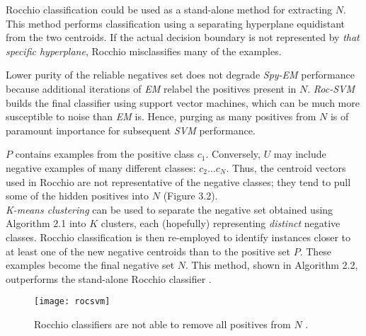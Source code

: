 \documentclass[12pt,twoside,notitlepage,amsart]{report} %
\begin{document}
	
	Rocchio classification could be used as a stand-alone method for extracting $N$. This method performs classification using a separating hyperplane equidistant from the two centroids. If the actual decision boundary is not represented by \emph{that specific hyperplane}, Rocchio misclassifies many of the examples. 
	
	Lower purity of the reliable negatives set does not degrade \emph{Spy-EM} performance because additional iterations of \emph{EM} relabel the positives present in $N$. \emph{Roc-SVM} builds the final classifier using support vector machines, which can be much more susceptible to noise than \emph{EM} is. Hence, purging as many positives from $N$ is of paramount importance for subsequent \emph{SVM} performance. 

	$P$ contains examples from the positive class $c_1$. Conversely, $U$ may include negative examples of many different classes: $c_2 \ldots c_N$. Thus, the centroid vectors used in Rocchio are not representative of the negative classes; they tend to pull some of the hidden positives into $N$ (Figure 3.2). \\

 \emph{K-means clustering} can be used to separate the negative set obtained using Algorithm 2.1 into $K$ clusters, each (hopefully) representing \emph{distinct} negative classes. Rocchio classification is then re-employed to identify instances closer to at least one of the new negative centroids than to the positive set $P$. These examples become the final negative set $N$. This method, shown in Algorithm 2.2, outperforms the stand-alone Rocchio classifier \cite{Li03}. 


	\begin{figure}
	\texttt{[image: rocsvm]}
	
	\caption{\small{Rocchio classifiers are not able to remove all positives from $N$ \cite{Li03}.}}%
	\label{}%
	\end{figure}
	
	\clearpage
	
	\renewcommand{\thealgorithm}{2.2}
	
\end{document}
